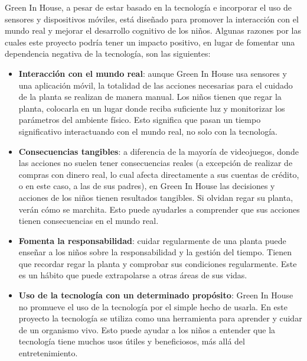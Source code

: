 Green In House, a pesar de estar basado en la tecnología e incorporar el uso de sensores y dispositivos móviles, está diseñado para promover la interacción con el mundo real y mejorar el desarrollo cognitivo de los niños. Algunas razones por las cuales este proyecto podría tener un impacto positivo, en lugar de fomentar una dependencia negativa de la tecnología, son las siguientes:
\begin{itemize}
    \item \textbf{Interacción con el mundo real}: aunque Green In House usa sensores y una aplicación móvil, la totalidad de las acciones necesarias para el cuidado de la planta se realizan de manera manual. Los niños tienen que regar la planta, colocarla en un lugar donde reciba suficiente luz y monitorizar los parámetros del ambiente físico. Esto significa que pasan un tiempo significativo interactuando con el mundo real, no solo con la tecnología.
    \item \textbf{Consecuencias tangibles}: a diferencia de la mayoría de videojuegos, donde las acciones no suelen tener consecuencias reales (a excepción de realizar de compras con dinero real, lo cual afecta directamente a sus cuentas de crédito, o en este caso, a las de sus padres), en Green In House las decisiones y acciones de los niños tienen resultados tangibles. Si olvidan regar su planta, verán cómo se marchita. Esto puede ayudarles a comprender que sus acciones tienen consecuencias en el mundo real. 
    \item \textbf{Fomenta la responsabilidad}: cuidar regularmente de una planta puede enseñar a los niños sobre la responsabilidad y la gestión del tiempo. Tienen que recordar regar la planta y comprobar sus condiciones regularmente. Este es un hábito que puede extrapolarse a otras áreas de sus vidas.  
    \item \textbf{Uso de la tecnología con un determinado propósito}: Green In House no promueve el uso de la tecnología por el simple hecho de usarla. En este proyecto la tecnología se utiliza como una herramienta para aprender y cuidar de un organismo vivo. Esto puede ayudar a los niños a entender que la tecnología tiene muchos usos útiles y beneficiosos, más allá del entretenimiento.
\end{itemize}


